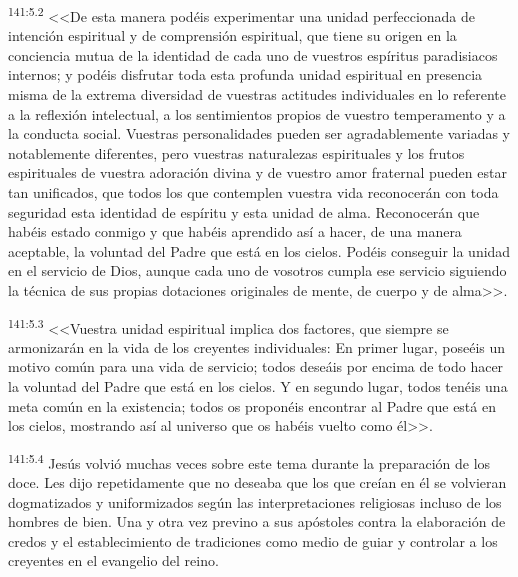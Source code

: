 \par 
\textsuperscript{141:5.2} <<De esta manera podéis experimentar una unidad perfeccionada de intención espiritual y de comprensión espiritual, que tiene su origen en la conciencia mutua de la identidad de cada uno de vuestros espíritus paradisiacos internos; y podéis disfrutar toda esta profunda unidad espiritual en presencia misma de la extrema diversidad de vuestras actitudes individuales en lo referente a la reflexión intelectual, a los sentimientos propios de vuestro temperamento y a la conducta social. Vuestras personalidades pueden ser agradablemente variadas y notablemente diferentes, pero vuestras naturalezas espirituales y los frutos espirituales de vuestra adoración divina y de vuestro amor fraternal pueden estar tan unificados, que todos los que contemplen vuestra vida reconocerán con toda seguridad esta identidad de espíritu y esta unidad de alma. Reconocerán que habéis estado conmigo y que habéis aprendido así a hacer, de una manera aceptable, la voluntad del Padre que está en los cielos. Podéis conseguir la unidad en el servicio de Dios, aunque cada uno de vosotros cumpla ese servicio siguiendo la técnica de sus propias dotaciones originales de mente, de cuerpo y de alma>>.

\par 
\textsuperscript{141:5.3} <<Vuestra unidad espiritual implica dos factores, que siempre se armonizarán en la vida de los creyentes individuales: En primer lugar, poseéis un motivo común para una vida de servicio; todos deseáis por encima de todo hacer la voluntad del Padre que está en los cielos. Y en segundo lugar, todos tenéis una meta común en la existencia; todos os proponéis encontrar al Padre que está en los cielos, mostrando así al universo que os habéis vuelto como él>>.

\par 
\textsuperscript{141:5.4} Jesús volvió muchas veces sobre este tema durante la preparación de los doce. Les dijo repetidamente que no deseaba que los que creían en él se volvieran dogmatizados y uniformizados según las interpretaciones religiosas incluso de los hombres de bien. Una y otra vez previno a sus apóstoles contra la elaboración de credos y el establecimiento de tradiciones como medio de guiar y controlar a los creyentes en el evangelio del reino.

